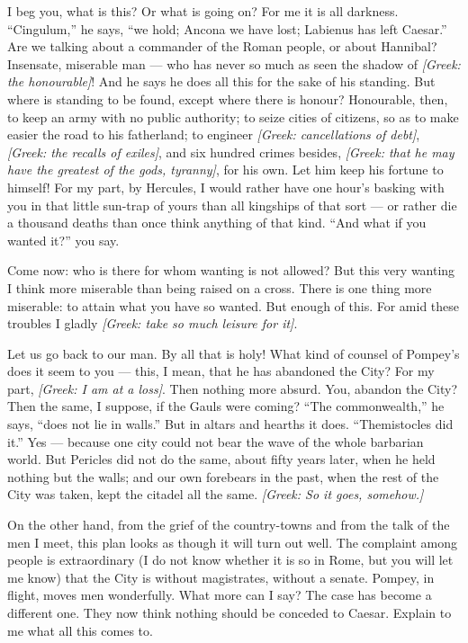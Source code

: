 

 I beg you, what is this? Or what is going on? For me it is all darkness. ``Cingulum,'' he says, ``we hold; Ancona we have lost; Labienus has left Caesar.'' Are we talking about a commander of the Roman people, or about Hannibal? Insensate, miserable man --- who has never so much as seen the shadow of \textit{[Greek: the honourable]}! And he says he does all this for the sake of his standing. But where is standing to be found, except where there is honour? Honourable, then, to keep an army with no public authority; to seize cities of citizens, so as to make easier the road to his fatherland; to engineer \textit{[Greek: cancellations of debt]}, \textit{[Greek: the recalls of exiles]}, and six hundred crimes besides, \textit{[Greek: that he may have the greatest of the gods, tyranny]}, for his own. Let him keep his fortune to himself! For my part, by Hercules, I would rather have one hour's basking with you in that little sun-trap of yours than all kingships of that sort --- or rather die a thousand deaths than once think anything of that kind. ``And what if you wanted it?'' you say.

 Come now: who is there for whom wanting is not allowed? But this very wanting I think more miserable than being raised on a cross. There is one thing more miserable: to attain what you have so wanted. But enough of this. For amid these troubles I gladly \textit{[Greek: take so much leisure for it]}.

 Let us go back to our man. By all that is holy! What kind of counsel of Pompey's does it seem to you --- this, I mean, that he has abandoned the City? For my part, \textit{[Greek: I am at a loss]}. Then nothing more absurd. You, abandon the City? Then the same, I suppose, if the Gauls were coming? ``The commonwealth,'' he says, ``does not lie in walls.'' But in altars and hearths it does. ``Themistocles did it.'' Yes --- because one city could not bear the wave of the whole barbarian world. But Pericles did not do the same, about fifty years later, when he held nothing but the walls; and our own forebears in the past, when the rest of the City was taken, kept the citadel all the same. \textit{[Greek: So it goes, somehow.]}

 On the other hand, from the grief of the country-towns and from the talk of the men I meet, this plan looks as though it will turn out well. The complaint among people is extraordinary (I do not know whether it is so in Rome, but you will let me know) that the City is without magistrates, without a senate. Pompey, in flight, moves men wonderfully. What more can I say? The case has become a different one. They now think nothing should be conceded to Caesar. Explain to me what all this comes to.

